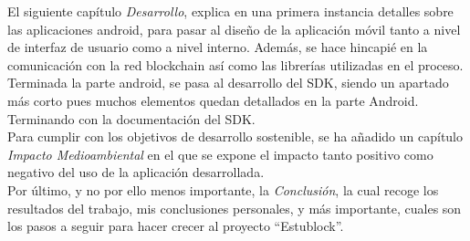 El siguiente capítulo \emph{Desarrollo}, explica en una primera instancia detalles sobre las aplicaciones android, para pasar al diseño de la aplicación móvil tanto a nivel de interfaz de usuario como a nivel interno. Además, se hace hincapié en la comunicación con la red blockchain así como las librerías utilizadas en el proceso. Terminada la parte android, se pasa al desarrollo del SDK, siendo un apartado más corto pues muchos elementos quedan detallados en la parte Android. Terminando con la documentación del SDK. \\

Para cumplir con los objetivos de desarrollo sostenible, se ha añadido un capítulo \emph{Impacto Medioambiental} en el que se expone el impacto tanto positivo como negativo del uso de la aplicación desarrollada. \\

Por último, y no por ello menos importante, la \emph{Conclusión}, la cual recoge los resultados del trabajo, mis conclusiones personales, y más importante, cuales son los pasos a seguir para hacer crecer al proyecto ``Estublock''.

